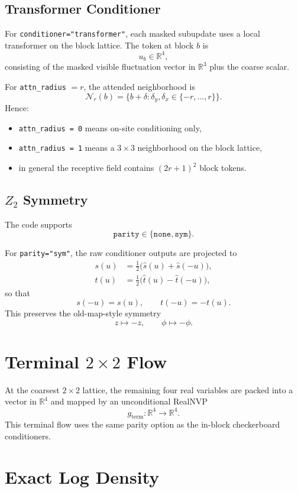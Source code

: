 \documentclass[11pt]{article}
\begin{document}
\subsection{Transformer Conditioner}

For \texttt{conditioner="transformer"}, each masked subupdate uses a local
transformer on the block lattice. The token at block $b$ is
\[
u_b\in\mathbb{R}^4,
\]
consisting of the masked visible fluctuation vector in $\mathbb{R}^3$ plus the
coarse scalar.

For \texttt{attn\_radius} $= r$, the attended neighborhood is
\[
\mathcal N_r(b)=\{b+\delta:\delta_y,\delta_x\in\{-r,\dots,r\}\}.
\]
Hence:
\begin{itemize}
\item \texttt{attn\_radius = 0} means on-site conditioning only,
\item \texttt{attn\_radius = 1} means a $3\times 3$ neighborhood on the block
lattice,
\item in general the receptive field contains $(2r+1)^2$ block tokens.
\end{itemize}

\subsection{$Z_2$ Symmetry}

The code supports
\[
\texttt{parity}\in\{\texttt{none},\texttt{sym}\}.
\]

For \texttt{parity="sym"}, the raw conditioner outputs are projected to
\begin{align}
s(u) &= \frac12\bigl(\hat s(u) + \hat s(-u)\bigr), \\
t(u) &= \frac12\bigl(\hat t(u) - \hat t(-u)\bigr),
\end{align}
so that
\[
s(-u)=s(u),\qquad t(-u)=-t(u).
\]
This preserves the old-map-style symmetry
\[
z\mapsto -z,\qquad \phi\mapsto -\phi.
\]

\section{Terminal $2\times 2$ Flow}

At the coarsest $2\times 2$ lattice, the remaining four real variables are
packed into a vector in $\mathbb{R}^4$ and mapped by an unconditional RealNVP
\[
g_{\mathrm{term}}:\mathbb{R}^4\to\mathbb{R}^4.
\]
This terminal flow uses the same parity option as the in-block checkerboard
conditioners.

\section{Exact Log Density}
\end{document}
